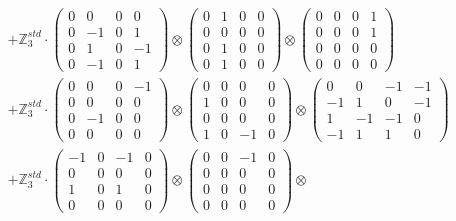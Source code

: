\documentclass{article}
\begin{document}
{\begin{align}
        &+ \label{Rs16-Rc11-Solution-14-c22} \mathbb{Z}_3^{std} \cdot 
            \begin{pmatrix} 0 & 0 & 0 & 0 \\ 0 & -1 & 0 & 1 \\ 0 & 1 & 0 & -1 \\ 0 & -1 & 0 & 1 \end{pmatrix} \otimes 
            \begin{pmatrix} 0 & 1 & 0 & 0 \\ 0 & 0 & 0 & 0 \\ 0 & 1 & 0 & 0 \\ 0 & 1 & 0 & 0 \end{pmatrix} \otimes 
            \begin{pmatrix} 0 & 0 & 0 & 1 \\ 0 & 0 & 0 & 1 \\ 0 & 0 & 0 & 0 \\ 0 & 0 & 0 & 0 \end{pmatrix} \\ 
        &+ \label{Rs16-Rc11-Solution-14-c23} \mathbb{Z}_3^{std} \cdot 
            \begin{pmatrix} 0 & 0 & 0 & -1 \\ 0 & 0 & 0 & 0 \\ 0 & -1 & 0 & 0 \\ 0 & 0 & 0 & 0 \end{pmatrix} \otimes 
            \begin{pmatrix} 0 & 0 & 0 & 0 \\ 1 & 0 & 0 & 0 \\ 0 & 0 & 0 & 0 \\ 1 & 0 & -1 & 0 \end{pmatrix} \otimes 
            \begin{pmatrix} 0 & 0 & -1 & -1 \\ -1 & 1 & 0 & -1 \\ 1 & -1 & -1 & 0 \\ -1 & 1 & 1 & 0 \end{pmatrix} \\ 
        &+ \label{Rs16-Rc11-Solution-14-c24} \mathbb{Z}_3^{std} \cdot 
            \begin{pmatrix} -1 & 0 & -1 & 0 \\ 0 & 0 & 0 & 0 \\ 1 & 0 & 1 & 0 \\ 0 & 0 & 0 & 0 \end{pmatrix} \otimes 
            \begin{pmatrix} 0 & 0 & -1 & 0 \\ 0 & 0 & 0 & 0 \\ 0 & 0 & 0 & 0 \\ 0 & 0 & 0 & 0 \end{pmatrix} \otimes 

\end{align}}
\end{document}
